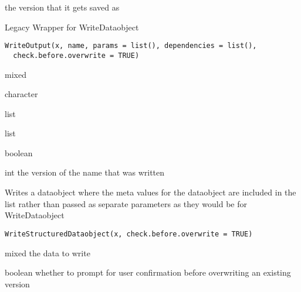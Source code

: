 \documentclass[a4paper]{book}
\begin{document}
%
\begin{Value}
the version that it gets saved as
\end{Value}
%
\begin{Description}\relax
Legacy Wrapper for WriteDataobject
\end{Description}
%
\begin{Usage}
\begin{verbatim}
WriteOutput(x, name, params = list(), dependencies = list(),
  check.before.overwrite = TRUE)
\end{verbatim}
\end{Usage}
%
\begin{Arguments}
\begin{ldescription}
\item[\code{x}] mixed

\item[\code{name}] character

\item[\code{params}] list

\item[\code{dependencies}] list

\item[\code{check.before.overwrite}] boolean
\end{ldescription}
\end{Arguments}
%
\begin{Value}
int the version of the name that was written
\end{Value}
%
\begin{Description}\relax
Writes a dataobject where the meta values for the dataobject are included in the list
rather than passed as separate parameters as they would be for WriteDataobject
\end{Description}
%
\begin{Usage}
\begin{verbatim}
WriteStructuredDataobject(x, check.before.overwrite = TRUE)
\end{verbatim}
\end{Usage}
%
\begin{Arguments}
\begin{ldescription}
\item[\code{x}] mixed the data to write

\item[\code{check.before.overwrite}] boolean whether to prompt for user confirmation before overwriting an existing version
\end{ldescription}
\end{Arguments}
\end{document}

